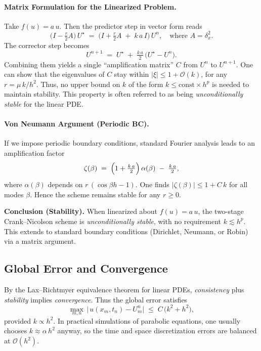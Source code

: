 \paragraph{Matrix Formulation for the Linearized Problem.}
Take \(f(u) = a\,u\). Then the predictor step in vector form reads
\[
  \bigl(I - \tfrac{r}{2}A\bigr)\,U^\star
  \;=\;
  \bigl(I + \tfrac{r}{2}A \;+\; k\,a\,I \bigr)\,U^n,
  \quad\text{where }A = \delta_x^2.
\]
The corrector step becomes
\[
  U^{n+1}
  \;=\;
  U^\star \;+\;\tfrac{k\,a}{2}\,\bigl(U^\star - U^n\bigr).
\]
Combining them yields a single ``amplification matrix'' \(C\) from \(U^n\) to \(U^{n+1}\).
One can show that the eigenvalues of \(C\) stay within \(\lvert\xi\rvert \le 1 + \mathcal{O}(k)\),
for any \(r = \mu\,k/h^2\). Thus, no upper bound on \(k\) of the form \(k\le \mathrm{const}\times h^p\)
is needed to maintain stability. This property is often referred to as being
\emph{unconditionally stable} for the linear PDE.

\paragraph{Von Neumann Argument (Periodic BC).}
If we impose periodic boundary conditions, standard Fourier analysis leads to an
amplification factor
\[
  \zeta(\beta) \;=\;
  \Bigl(1 + \tfrac{k\,a}{2}\Bigr)\,\alpha(\beta) 
  \;-\;
  \tfrac{k\,a}{2},
\]
where \(\alpha(\beta)\) depends on \(r\,(\cos\beta h - 1)\). One finds
\(\bigl|\zeta(\beta)\bigr| \le 1 + C\,k\) for all modes \(\beta\). Hence the scheme remains
stable for any \(r\ge0\).

\medskip
\noindent
\textbf{Conclusion (Stability).} When linearized about \(f(u)=a\,u\), the two-stage
Crank–Nicolson scheme is \emph{unconditionally stable}, with no requirement
\(k\lesssim h^p\). This extends to standard boundary conditions (Dirichlet, Neumann, or
Robin) via a matrix argument.

\subsection{Global Error and Convergence}

By the Lax–Richtmyer equivalence theorem for linear PDEs, \emph{consistency} plus
\emph{stability} implies \emph{convergence}. Thus the global error satisfies
\[
  \max_{m,n}\,\bigl|\,u(x_m,t_n) - U_m^n\bigr|
  \;\le\;
  C\,\bigl(k^2 + h^2\bigr),
\]
provided \(k \propto h^2\). In practical simulations of parabolic equations, one usually
chooses \(k \approx \alpha \,h^2\) anyway, so the time and space discretization errors
are balanced at \(\mathcal{O}(h^2)\).

